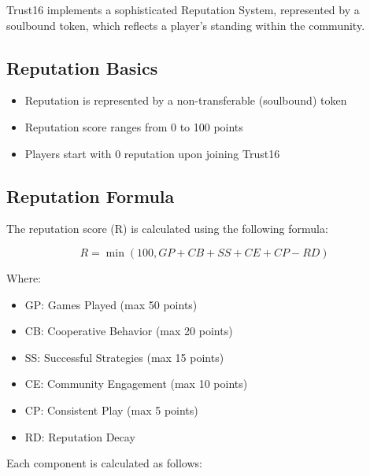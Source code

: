 \documentclass[12pt,a4paper]{article}
\begin{document}
Trust16 implements a sophisticated Reputation System, represented by a soulbound token, which reflects a player's standing within the community.

\subsection{Reputation Basics}
\begin{itemize}
  \item Reputation is represented by a non-transferable (soulbound) token
  \item Reputation score ranges from 0 to 100 points
  \item Players start with 0 reputation upon joining Trust16
\end{itemize}

\subsection{Reputation Formula}
The reputation score (R) is calculated using the following formula:

\begin{equation}
R = \min(100, GP + CB + SS + CE + CP - RD)
\end{equation}

Where:
\begin{itemize}
  \item GP: Games Played (max 50 points)
  \item CB: Cooperative Behavior (max 20 points)
  \item SS: Successful Strategies (max 15 points)
  \item CE: Community Engagement (max 10 points)
  \item CP: Consistent Play (max 5 points)
  \item RD: Reputation Decay
\end{itemize}

Each component is calculated as follows:
\end{document}
